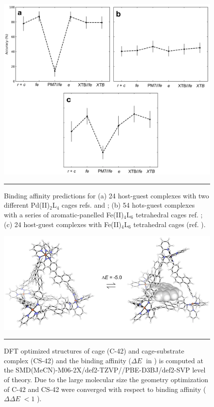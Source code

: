 \documentclass[../../main.tex]{subfiles}
\newcommand{\de}{$\Delta E$}
\newcommand{\dde}{$\Delta\Delta E$}
\begin{document}
\begin{figure}[h!]
	\vspace{0.4cm}
	\centering
	\includegraphics[width=\textwidth]{3/cgbind/figs/figS8.png}
	\vspace{0.2cm}
	\hrule
	\caption{Binding affinity predictions for (a) 24 host-guest complexes with two different Pd(II)$_2$L$_4$ cages refs. \cite{August2016} and \cite{MartCentelles2018}; (b) 54 hots-guest complexes with a series of aromatic-panelled Fe(II)$_4$L$_6$  tetrahedral cages ref. \cite{Ronson2017}; (c) 24 host-guest complexes with Fe(II)$_4$L$_6$ tetrahedral cages (ref. \cite{Smulders2013}).}
	\label{fig::si_cg_8}
\end{figure}




\begin{figure}[h!]
	\vspace{0.4cm}
	\centering
	\includegraphics[width=\textwidth]{3/cgbind/figs/figS9}
	\vspace{0.2cm}
	\hrule
	\caption{DFT optimized structures of cage (C-42) and cage-substrate complex (CS-42) and the binding affinity (\de$\;$ in \kcal) is computed at the SMD(MeCN)-M06-2X/def2-TZVP//PBE-D3BJ/def2-SVP level of theory. Due to the large molecular size the geometry optimization of C-42 and CS-42 were converged with respect to binding affinity (\dde $\;< 1$ \kcal).}
	\label{fig::si_cg_9}
\end{figure}


\clearpage
\end{document}
